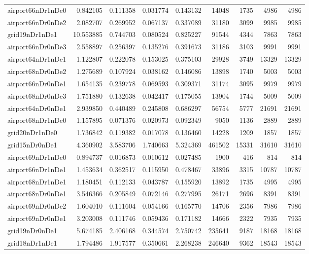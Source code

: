\begin{longtable}{|l|r|r|r|r|r|r|r|r|}
airport66nDr1nDe0 & 0.842105 & 0.111358 & 0.031774 & 0.143132 & 14048 & 1735 & 4986 & 4986 \\
airport66nDr0nDe2 & 2.082707 & 0.269952 & 0.067137 & 0.337089 & 31180 & 3099 & 9985 & 9985 \\
grid19nDr1nDe1 & 10.553885 & 0.744703 & 0.080524 & 0.825227 & 91544 & 4344 & 7863 & 7863 \\
airport66nDr0nDe3 & 2.558897 & 0.256397 & 0.135276 & 0.391673 & 31186 & 3103 & 9991 & 9991 \\
airport64nDr1nDe1 & 1.122807 & 0.222078 & 0.153025 & 0.375103 & 29928 & 3749 & 13329 & 13329 \\
airport68nDr0nDe2 & 1.275689 & 0.107924 & 0.038162 & 0.146086 & 13898 & 1740 & 5003 & 5003 \\
airport66nDr0nDe1 & 1.654135 & 0.239778 & 0.069593 & 0.309371 & 31174 & 3095 & 9979 & 9979 \\
airport68nDr0nDe3 & 1.751880 & 0.132638 & 0.042417 & 0.175055 & 13904 & 1744 & 5009 & 5009 \\
airport64nDr0nDe1 & 2.939850 & 0.440489 & 0.245808 & 0.686297 & 56754 & 5777 & 21691 & 21691 \\
airport68nDr1nDe0 & 1.157895 & 0.071376 & 0.020973 & 0.092349 & 9050 & 1136 & 2889 & 2889 \\
grid20nDr1nDe0 & 1.736842 & 0.119382 & 0.017078 & 0.136460 & 14228 & 1209 & 1857 & 1857 \\
grid15nDr0nDe1 & 4.360902 & 3.583706 & 1.740663 & 5.324369 & 461502 & 15331 & 31610 & 31610 \\
airport69nDr1nDe0 & 0.894737 & 0.016873 & 0.010612 & 0.027485 & 1900 & 416 & 814 & 814 \\
airport66nDr1nDe1 & 1.453634 & 0.362517 & 0.115950 & 0.478467 & 33896 & 3315 & 10787 & 10787 \\
airport68nDr1nDe1 & 1.180451 & 0.112133 & 0.043787 & 0.155920 & 13892 & 1735 & 4995 & 4995 \\
airport68nDr0nDe1 & 3.546366 & 0.205849 & 0.072146 & 0.277995 & 26171 & 2696 & 8391 & 8391 \\
airport69nDr0nDe2 & 1.604010 & 0.111604 & 0.054166 & 0.165770 & 14706 & 2356 & 7986 & 7986 \\
airport69nDr0nDe1 & 3.203008 & 0.111746 & 0.059436 & 0.171182 & 14666 & 2322 & 7935 & 7935 \\
grid19nDr0nDe1 & 5.674185 & 2.406168 & 0.344574 & 2.750742 & 235641 & 9187 & 18168 & 18168 \\
grid18nDr1nDe1 & 1.794486 & 1.917577 & 0.350661 & 2.268238 & 246640 & 9362 & 18543 & 18543 \\

\end{longtable}
